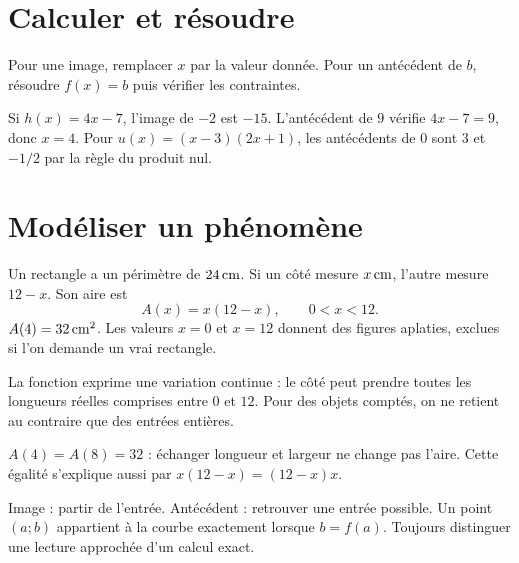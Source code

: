 \documentclass[../cours_3e.tex]{subfiles}
\begin{document}
\section{Calculer et résoudre}
\begin{methode}
Pour une image, remplacer $x$ par la valeur donnée. Pour un antécédent de $b$, résoudre $f(x)=b$ puis vérifier les contraintes.
\end{methode}
Si $h(x)=4x-7$, l'image de $-2$ est $-15$. L'antécédent de $9$ vérifie $4x-7=9$, donc $x=4$.
Pour $u(x)=(x-3)(2x+1)$, les antécédents de $0$ sont $3$ et $-1/2$ par la règle du produit nul.
\section{Modéliser un phénomène}
\begin{exemple}
Un rectangle a un périmètre de $24\,\mathrm{cm}$. Si un côté mesure $x\,\mathrm{cm}$, l'autre mesure $12-x$. Son aire est
\[A(x)=x(12-x),\qquad 0<x<12.\]
$A(4)=32\,\mathrm{cm^2}$. Les valeurs $x=0$ et $x=12$ donnent des figures aplaties, exclues si l'on demande un vrai rectangle.
\end{exemple}
La fonction exprime une variation continue : le côté peut prendre toutes les longueurs réelles comprises entre $0$ et $12$. Pour des objets comptés, on ne retient au contraire que des entrées entières.
\begin{exemple}
$A(4)=A(8)=32$ : échanger longueur et largeur ne change pas l'aire. Cette égalité s'explique aussi par $x(12-x)=(12-x)x$.
\end{exemple}
\begin{retenir}
Image : partir de l'entrée. Antécédent : retrouver une entrée possible. Un point $(a;b)$ appartient à la courbe exactement lorsque $b=f(a)$. Toujours distinguer une lecture approchée d'un calcul exact.
\end{retenir}
\end{document}
